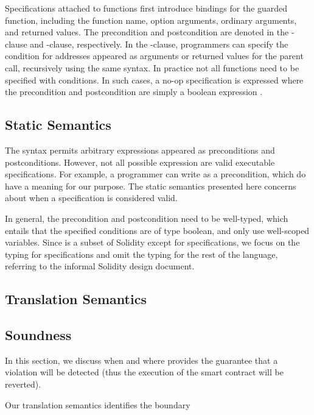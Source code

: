Specifications attached to functions first introduce bindings for the guarded
function, including the function name, option arguments, ordinary arguments,
and returned values.
The precondition and postcondition are denoted in the -clause and
-clause, respectively.
In the -clause, programmers can specify the condition for addresses
appeared as arguments or returned values for the parent call, recursively using
the same syntax.
In practice not all functions need to be specified with conditions.
In such cases, a no-op specification is expressed where the precondition and
postcondition are simply a boolean expression .

\subsection{Static Semantics}

The syntax permits arbitrary expressions appeared as preconditions and
postconditions.
However, not all possible expression are valid executable specifications.
For example, a programmer can write  as a precondition,
which do have a meaning for our purpose.
The static semantics presented here concerns about when a specification is
considered valid.

In general, the precondition and postcondition need to be well-typed, which
entails that the specified conditions are of type boolean, and only
use well-scoped variables.
Since \corelang is a subset of Solidity except for specifications, we focus on
the typing for specifications and omit the typing for the rest of the language,
referring to the informal Solidity design document.


\subsection{Translation Semantics}

\subsection{Soundness}

In this section, we discuss when and where \corelang provides the guarantee
that a violation will be detected (thus the execution of the smart contract
will be reverted).

Our translation semantics identifies the boundary


